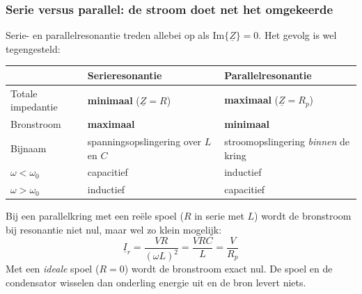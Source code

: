 \documentclass[a4paper,11pt]{article}
\begin{document}
\subsubsection{Serie versus parallel: de stroom doet net het omgekeerde}

Serie- en parallelresonantie treden allebei op als $\text{Im}\{\underline{Z}\} = 0$. Het gevolg is
wel tegengesteld:

\begin{center}
    \begin{tabular}{@{}p{34mm}p{44mm}p{44mm}@{}}
        \toprule
                            & \textbf{Serieresonantie}                & \textbf{Parallelresonantie}               \\
        \midrule
        Totale impedantie   & \textbf{minimaal} ($\underline{Z} = R$) & \textbf{maximaal} ($\underline{Z} = R_p$) \\[1mm]
        Bronstroom          & \textbf{maximaal}                       & \textbf{minimaal}                         \\[1mm]
        Bijnaam             & spanningsopslingering over $L$ en $C$   & stroomopslingering \emph{binnen} de kring \\[1mm]
        $\omega < \omega_0$ & capacitief                              & inductief                                 \\[1mm]
        $\omega > \omega_0$ & inductief                               & capacitief                                \\
        \bottomrule
    \end{tabular}
\end{center}

Bij een parallelkring met een re\"ele spoel ($R$ in serie met $L$) wordt de bronstroom bij
resonantie niet nul, maar wel zo klein mogelijk:
\[\underline{I}_r = \frac{V R}{(\omega L)^2} = \frac{V R C}{L} = \frac{V}{R_p}\]
Met een \emph{ideale} spoel ($R = 0$) wordt de bronstroom exact nul. De spoel en de condensator
wisselen dan onderling energie uit en de bron levert niets.
\end{document}
